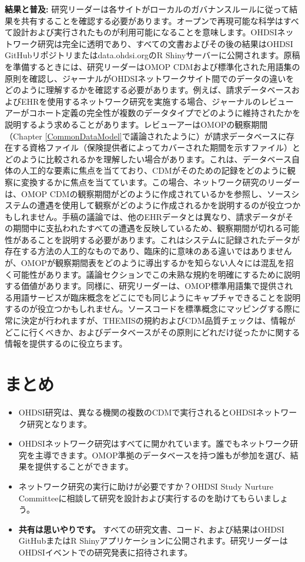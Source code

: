 \documentclass[
  11pt]{book}
\makeatletter
\providecommand{\tightlist}{%
  \setlength{\itemsep}{0pt}\setlength{\parskip}{0pt}}
\newenvironment{kframe}{%
\medskip{}
\setlength{\fboxsep}{.8em}
 \def\at@end@of@kframe{}%
 \ifinner\ifhmode%
  \def\at@end@of@kframe{\end{minipage}}%
  \begin{minipage}{\columnwidth}%
 \fi\fi%
 \def\FrameCommand##1{\hskip\@totalleftmargin \hskip-\fboxsep
 \colorbox{myShadeColor}{##1}\hskip-\fboxsep
     \hskip-\linewidth \hskip-\@totalleftmargin \hskip\columnwidth}%
 \MakeFramed {\advance\hsize-\width
   \@totalleftmargin\z@ \linewidth\hsize
   \@setminipage}}%
 {\par\unskip\endMakeFramed%
 \at@end@of@kframe}
\newenvironment{rmdblock}[1]
  {
  \begin{itemize}
  \renewcommand{\labelitemi}{
    \raisebox{-.7\height}[0pt][0pt]{
      {\setkeys{Gin}{width=3em,keepaspectratio}\texttt{[image: images/\#1]}}
    }
  }
  \setlength{\fboxsep}{1em}
  \begin{kframe}
  \item
  }
  {
  \end{kframe}
  \end{itemize}
  }
\newenvironment{rmdsummary}
  {\begin{rmdblock}{summary}}
  {\end{rmdblock}}
\theoremstyle{definition}
\theoremstyle{definition}
\theoremstyle{definition}
\theoremstyle{definition}
\theoremstyle{remark}
\makeatother
\begin{document}
\textbf{結果と普及:} 研究リーダーは各サイトがローカルのガバナンスルールに従って結果を共有することを確認する必要があります。オープンで再現可能な科学はすべて設計および実行されたものが利用可能になることを意味します。OHDSIネットワーク研究は完全に透明であり、すべての文書およびその後の結果はOHDSI GitHubリポジトリまたはdata.ohdsi.orgのR Shinyサーバーに公開されます。原稿を準備するときには、研究リーダーはOMOP CDMおよび標準化された用語集の原則を確認し、ジャーナルがOHDSIネットワークサイト間でのデータの違いをどのように理解するかを確認する必要があります。例えば、請求データベースおよびEHRを使用するネットワーク研究を実施する場合、ジャーナルのレビューアーがコホート定義の完全性が複数のデータタイプでどのように維持されたかを説明するよう求めることがあります。レビューアーはOMOPの観察期間（Chapter \ref{CommonDataModel}で議論されたように）が請求データベースに存在する資格ファイル（保険提供者によってカバーされた期間を示すファイル）とどのように比較されるかを理解したい場合があります。これは、データベース自体の人工的な要素に焦点を当てており、CDMがそのための記録をどのように観察に変換するかに焦点を当てています。この場合、ネットワーク研究のリーダーは、OMOP CDMの観察期間がどのように作成されているかを参照し、ソースシステムの遭遇を使用して観察がどのように作成されるかを説明するのが役立つかもしれません。手稿の議論では、他のEHRデータとは異なり、請求データがその期間中に支払われたすべての遭遇を反映しているため、観察期間が切れる可能性があることを説明する必要があります。これはシステムに記録されたデータが存在する方法の人工的なものであり、臨床的に意味のある違いではありませんが、OMOPが観察期間表をどのように導出するかを知らない人々には混乱を招く可能性があります。議論セクションでこの未熟な規約を明確にするために説明する価値があります。同様に、研究リーダーは、OMOP標準用語集で提供される用語サービスが臨床概念をどこにでも同じようにキャプチャできることを説明するのが役立つかもしれません。ソースコードを標準概念にマッピングする際に常に決定が行われますが、THEMISの規約およびCDM品質チェックは、情報がどこに行くべきか、およびデータベースがその原則にどれだけ従ったかに関する情報を提供するのに役立ちます。

\section{まとめ}\label{ux307eux3068ux3081-14}

\begin{rmdsummary}
\begin{itemize}
\tightlist
\item
  OHDSI研究は、異なる機関の複数のCDMで実行されるとOHDSIネットワーク研究となります。
\item
  OHDSIネットワーク研究はすべてに開かれています。誰でもネットワーク研究を主導できます。OMOP準拠のデータベースを持つ誰もが参加を選び、結果を提供することができます。
\item
  ネットワーク研究の実行に助けが必要ですか？OHDSI Study Nurture Committeeに相談して研究を設計および実行するのを助けてもらいましょう。
\item
  \textbf{共有は思いやりです。} すべての研究文書、コード、および結果はOHDSI GitHubまたはR Shinyアプリケーションに公開されます。研究リーダーはOHDSIイベントでの研究発表に招待されます。
\end{itemize}
\end{rmdsummary}
\end{document}
